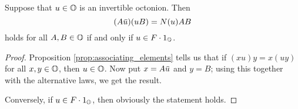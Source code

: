 \begin{corollary}
	Suppose that $u\in \mathbb{O}$ is an invertible octonion. Then
	\begin{equation}
		(A\mathord{\mbox{\hspace*{0pt}}\,\overline{\!u\!\!\;}\!\:}\mbox{\hspace*{0pt}})(u B) = N(u) AB
	\end{equation}
	holds for all $A,B \in \mathbb{O}$ if and only if $u \in F \cdot 1_{\mathbb{O}}$. 
\end{corollary}

\begin{proof}
	Proposition \ref{prop:associating_elements} tells us that if $(xu) y = x(uy)$ for all
	$x,y \in \mathbb{O}$, then $u \in \mathbb{O}$. Now put $x = A\mathord{\mbox{\hspace*{0pt}}\,\overline{\!u\!\!\;}\!\:}\mbox{\hspace*{0pt}}$ and $y = B$; using this together with
	the alternative laws, we get the result. 
	
	Conversely, if $u \in F\cdot 1_{\mathbb{O}}$, then obviously the statement holds. 
\end{proof}



